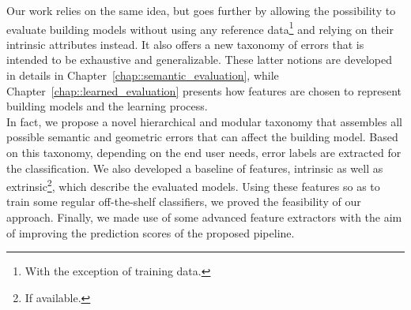         Our work relies on the same idea, but goes further by allowing the possibility to evaluate building models without using any reference data\footnote{With the exception of training data.} and relying on their intrinsic attributes instead.
        It also offers a new taxonomy of errors that is intended to be exhaustive and generalizable.
        These latter notions are developed in details in Chapter~\ref{chap::semantic_evaluation}, while Chapter~\ref{chap::learned_evaluation} presents how features are chosen to represent building models and the learning process.\\

        In fact, we propose a novel hierarchical and modular taxonomy that assembles all possible semantic and geometric errors that can affect the building model.
        Based on this taxonomy, depending on the end user needs, error labels are extracted for the classification.
        We also developed a baseline of features, intrinsic as well as extrinsic\footnote{If available.}, which describe the evaluated models.
        Using these features so as to train some regular off-the-shelf classifiers, we proved the feasibility of our approach.
        Finally, we made use of some advanced feature extractors with the aim of improving the prediction scores of the proposed pipeline.
